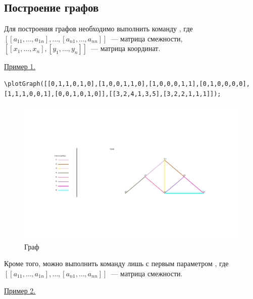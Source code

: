 \subsection{Построение графов}
Для построения графов необходимо выполнить команду 
, 
где $[[a_{11},\ldots,a_{1n}],\ldots,[a_{n1},\ldots,a_{nn}]]$~--- матрица смежности, $[[x_{1},\ldots, x_{n}],[y_{1},\ldots,y_{n}]]$~--- матрица координат.

\underline{Пример 1. }

\vspace*{-2mm}
\begin{verbatim}
\plotGraph([[0,1,1,0,1,0],[1,0,0,1,1,0],[1,0,0,0,1,1],[0,1,0,0,0,0],
[1,1,1,0,0,1],[0,0,1,0,1,0]],[[3,2,4,1,3,5],[3,2,2,1,1,1]]);
\end{verbatim}
\begin{figure}[!ht]
 \includegraphics[scale=0.4]{pictures/4_1}
\caption{Граф}
\label{4_1}
\end{figure}

Кроме того, можно выполнить команду лишь с первым параметром 
, 
где $[[a_{11},\ldots,a_{1n}],\ldots,[a_{n1},\ldots,a_{nn}]]$~--- матрица смежности.

\underline{Пример 2. }

